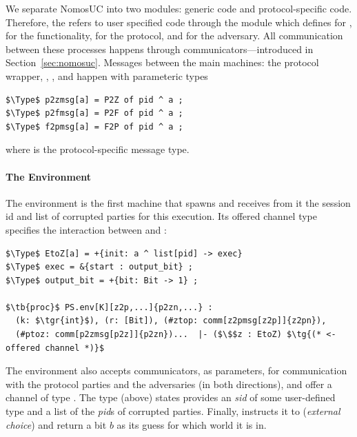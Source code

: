 We separate NomosUC into two modules: generic code and protocol-specific code. 
Therefore, the  refers to user specified code through the  module which defines  for \Z,  for the functionality,  for the protocol, and  for the adversary.
All communication between these processes happens through communicators---introduced in Section~\ref{sec:nomosuc}.
Messages between the main machines: the protocol wrapper, \A, \Z, and \F happen with parameteric types
\begin{lstlisting}[basicstyle=\footnotesize\BeraMonottFamily, frame=single, mathescape]
$\Type$ p2zmsg[a] = P2Z of pid ^ a ;
$\Type$ p2fmsg[a] = P2F of pid ^ a ;
$\Type$ f2pmsg[a] = F2P of pid ^ a ;
\end{lstlisting}
where  is the protocol-specific message type.

\paragraph{The Environment}
The environment is the first machine that  spawns and receives from it the session id and list of corrupted parties for this execution.
Its offered channel type  specifies the interaction between  and \Z:
\begin{lstlisting}[basicstyle=\footnotesize\BeraMonottFamily, mathescape, frame=single]
$\Type$ EtoZ[a] = +{init: a ^ list[pid] -> exec} 
$\Type$ exec = &{start : output_bit} ;
$\Type$ output_bit = +{bit: Bit -> 1} ;

$\tb{proc}$ PS.env[K][z2p,...]{p2zn,...} : 
  (k: $\tgr{int}$), (r: [Bit]), (#ztop: comm[z2pmsg[z2p]]{z2pn}), 
  (#ptoz: comm[p2zmsg[p2z]]{p2zn})...  |- ($\$$z : EtoZ) $\tg{(* <- offered channel *)}$
\end{lstlisting}
The environment also accepts communicators, as parameters, for communication with the protocol parties and the adversaries (in both directions), and offer a channel  of type .
The type (above) states \Z provides an \emph{sid} of some user-defined type  and a list of the \emph{pid}s of corrupted parties. 
Finally,  instructs it to  (\emph{external choice}) and return a bit $b$ as its guess for which world it is in.


